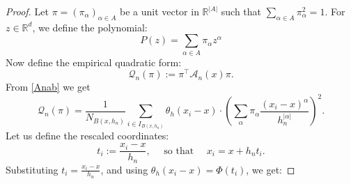 \documentclass{article}
\begin{document}
\begin{proof} 
Let $\pi=\left(\pi_\alpha\right)_{\alpha \in A}$ be a unit vector in $\mathbb{R}^{|A|}$ such that $\sum_{\alpha\in A} \pi_\alpha^2=1$. For $z\in\mathbb{R}^d$, we define the polynomial:
$$
P(z)=\sum_{\alpha \in A} \pi_\alpha z^\alpha
$$
Now define the empirical quadratic form:
$$
\mathcal{Q}_n(\pi):=\pi^{\top} \mathscr{A}_n(x) \pi.
$$
From \eqref{Anab} we get
$$
\mathcal{Q}_n(\pi)=\frac{1}{N_{B\left(x, h_n\right)}} \sum_{i \in I_{B\left(x, h_n\right)}} \theta_h\left(x_i-x\right) \cdot\left(\sum_\alpha \pi_\alpha \frac{\left(x_i-x\right)^\alpha}{h_n^{|\alpha|}}\right)^2 .
$$
Let us define the rescaled coordinates:
$$
t_i:=\frac{x_i-x}{h_n}, \quad \text { so that } \quad x_i=x+h_n t_i.
$$
Substituting $t_i=\frac{x_i-x}{h_n}$, and using $\theta_h\left(x_i-x\right)=\Phi\left(t_i\right)$, we get:


\end{proof}
\end{document}
